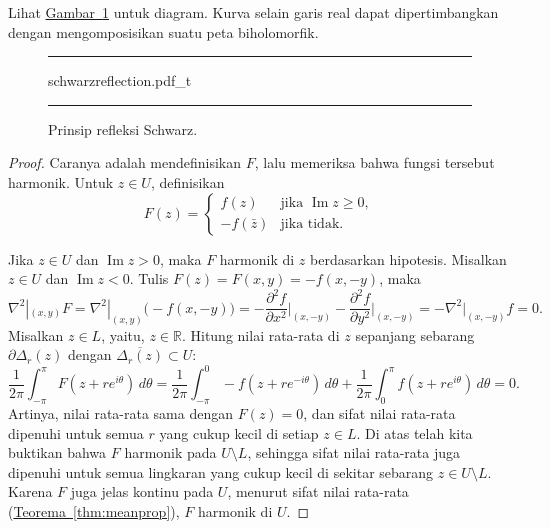 \documentclass[12pt,openany]{book}
\renewcommand{\Im}{\operatorname{Im}}
\newcommand{\R}{{\mathbb{R}}}
\theoremstyle{plain}
\theoremstyle{remark}
\theoremstyle{definition}
\newenvironment{myfig}{%
\begin{figure}[h!t]
\noindent\rule{\textwidth}{0.5pt}\vspace{12pt}\par\centering}%
{\par\noindent\rule{\textwidth}{0.5pt}
\end{figure}}
\theoremstyle{exercise}
\theoremstyle{example}
\newcommand{\figureref}[1]{\hyperref[#1]{Gambar~\ref*{#1}}}
\newcommand{\thmref}[1]{\hyperref[#1]{Teorema~\ref*{#1}}}
\begin{document}
Lihat \figureref{fig:schwarzreflection} untuk diagram.
Kurva selain garis real dapat dipertimbangkan dengan mengomposisikan suatu
peta biholomorfik.

\begin{myfig}
{schwarzreflection.pdf_t}
\caption{Prinsip refleksi Schwarz.\label{fig:schwarzreflection}}
\end{myfig}

\begin{proof}
Caranya adalah mendefinisikan $F$, lalu
memeriksa bahwa fungsi tersebut harmonik.
Untuk $z \in U$, definisikan
\begin{equation*}
F(z) =
\begin{cases}
f(z) & \text{jika } \Im z \geq 0, \\
-f(\bar{z}) & \text{jika tidak} .
\end{cases}
\end{equation*}

Jika $z \in U$ dan $\Im z > 0$, maka $F$ harmonik di $z$ berdasarkan hipotesis.
Misalkan $z \in U$ dan $\Im z < 0$.  Tulis $F(z) = F(x,y) = -f(x,-y)$, maka
\begin{equation*}
\nabla^2|_{(x,y)} F
=
\nabla^2|_{(x,y)} \bigl( -f(x,-y) \bigr)
=
- \frac{\partial^2 f}{\partial x^2}\Big|_{(x,-y)}
- \frac{\partial^2 f}{\partial y^2}\Big|_{(x,-y)}
=
- \nabla^2|_{(x,-y)} f = 0 .
\end{equation*}
Misalkan $z \in L$, yaitu, $z \in \R$.
Hitung nilai rata-rata di $z$ sepanjang sebarang
$\partial \Delta_r(z)$ dengan $\overline{\Delta_r(z)} \subset U$:
\begin{equation*}
\frac{1}{2\pi} \int_{-\pi}^{\pi} F(z+re^{i\theta})\, d\theta
=
\frac{1}{2\pi} \int_{-\pi}^{0} -f(z+re^{-i\theta})\, d\theta
+
\frac{1}{2\pi} \int_{0}^{\pi} f(z+re^{i\theta})\, d\theta
=
0 .
\end{equation*}
Artinya, nilai rata-rata sama dengan $F(z) = 0$,
dan sifat nilai rata-rata dipenuhi untuk semua
$r$ yang cukup kecil di setiap $z \in L$.
Di atas telah kita buktikan bahwa $F$ harmonik pada $U \setminus L$,
sehingga sifat nilai rata-rata
juga dipenuhi untuk semua lingkaran yang cukup kecil
di sekitar sebarang $z \in U \setminus L$.
Karena $F$ juga jelas kontinu pada $U$,
menurut sifat nilai rata-rata (\thmref{thm:meanprop}), $F$ harmonik di $U$.
\end{proof}
\end{document}
